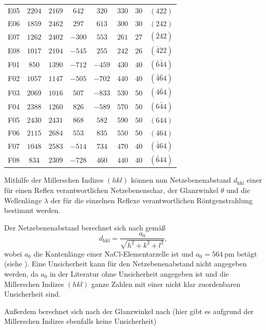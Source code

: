 \begin{table}[H]
\begin{tabular}{c|c|c|c|c|c|c|c}
        E05 & $2204$ & $2169$ & $ 642$ & $ 320$ & $330$ & $30$ & $(422)$ \\
        E06 & $1859$ & $2462$ & $ 297$ & $ 613$ & $300$ & $30$ & $(242)$ \\
        E07 & $1262$ & $2402$ & $-300$ & $ 553$ & $261$ & $27$ & $(\bar{2}42)$ \\
        E08 & $1017$ & $2104$ & $-545$ & $ 255$ & $242$ & $26$ & $(\bar{4}22)$ \\
        F01 & $ 850$ & $1390$ & $-712$ & $-459$ & $430$ & $40$ & $(\bar{6}\bar{4}4)$ \\
        F02 & $1057$ & $1147$ & $-505$ & $-702$ & $440$ & $40$ & $(\bar{4}\bar{6}4)$ \\
        F03 & $2069$ & $1016$ & $ 507$ & $-833$ & $530$ & $50$ & $(4\bar{6}4)$ \\
        F04 & $2388$ & $1260$ & $ 826$ & $-589$ & $570$ & $50$ & $(6\bar{4}4)$ \\
        F05 & $2430$ & $2431$ & $ 868$ & $ 582$ & $590$ & $50$ & $(644)$ \\
        F06 & $2115$ & $2684$ & $ 553$ & $ 835$ & $550$ & $50$ & $(464)$ \\
        F07 & $1048$ & $2583$ & $-514$ & $ 734$ & $470$ & $40$ & $(\bar{4}64)$ \\
        F08 & $ 834$ & $2309$ & $-728$ & $ 460$ & $440$ & $40$ & $(\bar{6}44)$                
    \end{tabular}\label{tab:miller2}
\end{table}\newpage
Mithilfe der Millerschen Indizes $(hkl)$ können nun Netzebenenabstand $d_{\mathrm{hkl}}$ einer für einen Reflex verantwortlichen Netzebenenschar, der Glanzwinkel $\theta$
und die Wellenlänge $\lambda$ der für die einzelnen Reflexe verantwortlichen Röntgenstrahlung bestimmt werden.\par
Der Netzebenenabstand berechnet sich nach \cite{laue_handblatt} gemäß
\begin{equation*}
    d_{\mathrm{hkl}} = \frac{a_0}{\sqrt{h^2 + k^2 + l^2}} ,
\end{equation*} wobei $a_0$ die Kantenlänge einer NaCl-Elementarzelle ist und $a_0 = \SI{564}{\pico \meter}$ betägt (siehe \cite{nacl}). Eine Unsicherheit kann
für den Netzebenenabstand nicht angegeben werden, da $a_0$ in der Literatur ohne Unsicherheit angegeben ist und die Millerschen Indizes $(hkl)$ ganze Zahlen
mit einer nicht klar zuordenbaren Unsicherheit sind.\par
Außerdem berechnet sich nach \cite{laue_handblatt} der Glanzwinkel nach (hier gibt es aufgrund der Millerschen Indizes ebenfalls keine Unsicherheit)
